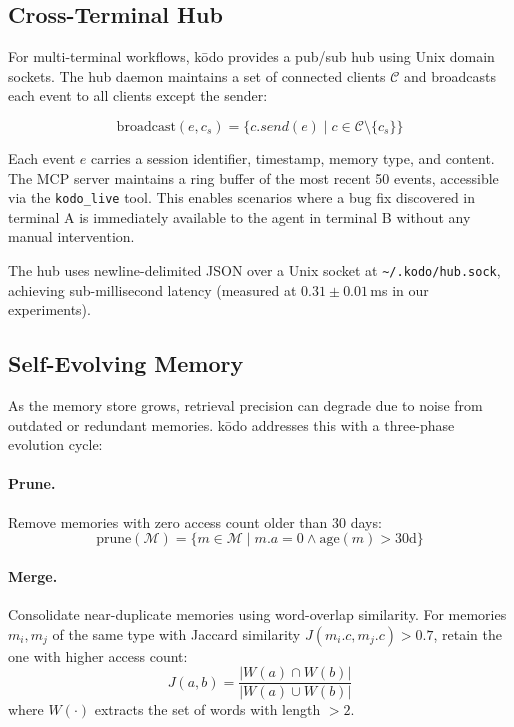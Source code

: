 \documentclass{article}
\begin{document}
\subsection{Cross-Terminal Hub}
\label{sec:hub}

For multi-terminal workflows, k\=odo provides a pub/sub hub using Unix domain sockets. The hub daemon maintains a set of connected clients $\mathcal{C}$ and broadcasts each event to all clients except the sender:

\begin{equation}
    \text{broadcast}(e, c_s) = \{c.send(e) \mid c \in \mathcal{C} \setminus \{c_s\}\}
    \label{eq:broadcast}
\end{equation}

Each event $e$ carries a session identifier, timestamp, memory type, and content. The MCP server maintains a ring buffer of the most recent 50 events, accessible via the \texttt{kodo\_live} tool. This enables scenarios where a bug fix discovered in terminal A is immediately available to the agent in terminal B without any manual intervention.

The hub uses newline-delimited JSON over a Unix socket at \texttt{\textasciitilde/.kodo/hub.sock}, achieving sub-millisecond latency (measured at $0.31 \pm 0.01$\,ms in our experiments).

\subsection{Self-Evolving Memory}
\label{sec:evolve_method}

As the memory store grows, retrieval precision can degrade due to noise from outdated or redundant memories. k\=odo addresses this with a three-phase evolution cycle:

\paragraph{Prune.} Remove memories with zero access count older than 30 days:
\begin{equation}
    \text{prune}(\mathcal{M}) = \{m \in \mathcal{M} \mid m.a = 0 \wedge \text{age}(m) > 30\text{d}\}
    \label{eq:prune}
\end{equation}

\paragraph{Merge.} Consolidate near-duplicate memories using word-overlap similarity. For memories $m_i, m_j$ of the same type with Jaccard similarity $J(m_i.c, m_j.c) > 0.7$, retain the one with higher access count:
\begin{equation}
    J(a, b) = \frac{|W(a) \cap W(b)|}{|W(a) \cup W(b)|}
    \label{eq:jaccard}
\end{equation}
where $W(\cdot)$ extracts the set of words with length $> 2$.
\end{document}
